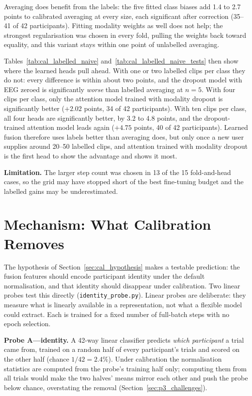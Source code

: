 Averaging does benefit from the labels: the five fitted class biases add 1.4 to 2.7
points to calibrated averaging at every size, each significant after correction (35--41
of 42 participants). Fitting modality weights as well does not help; the strongest
regularisation was chosen in every fold, pulling the weights back toward equality, and
this variant stays within one point of unlabelled averaging.

Tables~\ref{tab:cal_labelled_naive} and~\ref{tab:cal_labelled_naive_tests} then show
where the learned heads pull ahead. With one or two labelled clips per class they do
not: every difference is within about two points, and the dropout model with EEG zeroed
is significantly \emph{worse} than labelled averaging at $n = 5$. With four clips per
class, only the attention model trained with modality dropout is significantly better
($+2.02$ points, 34 of 42 participants). With ten clips per class, all four heads are
significantly better, by 3.2 to 4.8 points, and the dropout-trained attention model
leads again ($+4.75$ points, 40 of 42 participants). Learned fusion therefore uses
labels better than averaging does, but only once a new user supplies around 20--50
labelled clips, and attention trained with modality dropout is the first head to show
the advantage and shows it most.

\textbf{Limitation.} The larger step count was chosen in 13 of the 15 fold-and-head
cases, so the grid may have stopped short of the best fine-tuning budget and the
labelled gains may be underestimated.

\section{Mechanism: What Calibration Removes}
\label{sec:cal_mechanism}

The hypothesis of Section~\ref{sec:cal_hypothesis} makes a testable prediction: the
fusion features should encode participant identity under the default normalisation,
and that identity should disappear under calibration. Two linear probes test this
directly (\texttt{identity\_probe.py}). Linear probes are deliberate: they measure
what is linearly available in a representation, not what a flexible model could
extract. Each is trained for a fixed number of full-batch steps with no epoch
selection.

\textbf{Probe A---identity.} A 42-way linear classifier predicts \emph{which
participant} a trial came from, trained on a random half of every participant's
trials and scored on the other half (chance $1/42 = 2.4\%$). Under calibration the
normalisation statistics are computed from the probe's training half only; computing
them from all trials would make the two halves' means mirror each other and push the
probe below chance, overstating the removal (Section~\ref{sec:p3_challenges}).


